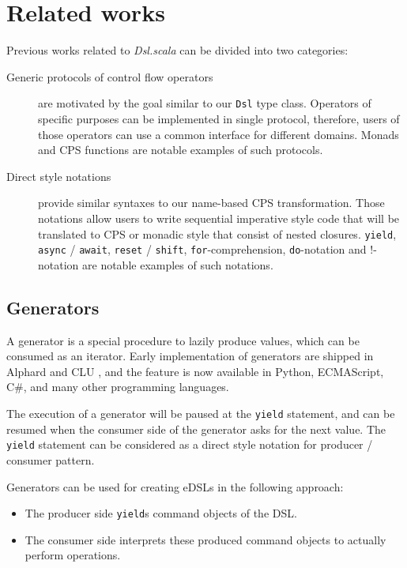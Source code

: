 \section{Related works}

Previous works related to \textit{Dsl.scala} can be divided into two categories:

\begin{description}
  \item[Generic protocols of control flow operators] are motivated by the goal similar to our \lstinline{Dsl} type class. Operators of specific purposes can be implemented in single protocol, therefore, users of those operators can use a common interface for different domains. Monads and CPS functions are notable examples of such protocols.
  \item[Direct style notations] provide similar syntaxes to our name-based CPS transformation. Those notations allow users to write sequential imperative style code that will be translated to CPS or monadic style that consist of nested closures. \lstinline{yield}, \lstinline{async} / \lstinline{await}, \lstinline{reset} / \lstinline{shift}, \lstinline{for}-comprehension, \lstinline{do}-notation and !-notation are notable examples of such notations.
\end{description}

\subsection{Generators}

A generator is a special procedure to lazily produce values, which can be consumed as an iterator. Early implementation of generators are shipped in Alphard \cite{shaw1977abstraction} and CLU \cite{liskov1977abstraction}, and the feature is now available in Python, ECMAScript, C\#, and many other programming languages.

The execution of a generator will be paused at the \lstinline{yield} statement, and can be resumed when the consumer side of the generator asks for the next value. The \lstinline{yield} statement can be considered as a direct style notation for producer / consumer pattern.

Generators can be used for creating eDSLs in the following approach:

\begin{itemize}
  \item The producer side \lstinline{yield}s command objects of the DSL.
  \item The consumer side interprets these produced command objects to actually perform operations.
\end{itemize}


